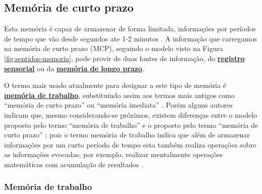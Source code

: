 \subsection{Memória de curto prazo } 
\label{sec:memoria:curto}



Esta memória é capaz de armazenar de forma limitada, 
informações por períodos de tempo que vão desde segundos ate 1-2 minutos
\cite[pp. 678]{spreen2006compendium} \cite[pp. 158]{sternbergpsicologia}.
A informação que carregamos na memória de curto prazo (MCP),
seguindo o modelo visto na Figura \ref{fig:sentidos-memoria},  
pode provir de duas fontes de informação, do \hyperref[fig:sentidos-memoria]{\textbf{registro sensorial}} 
ou da \hyperref[sec:memoria:longo]{\textbf{memória de longo prazo}}.


O termo mais usado atualmente para designar a este tipo de memória é 
\hyperref[subsubsec:memoriatrabalho]{\textbf{memória de trabalho}},
substituindo assim aos termos mais antigos como ``memória de curto prazo'' ou ``memória imediata''
\cite[pp. 678]{spreen2006compendium}.
Porém alguns autores indicam  que, mesmo considerando-se próximos, 
existem diferenças entre o modelo proposto pelo termo 
``memória de trabalho'' e o proposto pelo termo ``memória de curto prazo'' 
\cite[pp. 266, 267, 269]{braisby2012cognitive};
pois o termo memória de trabalho indica que além de armazenar informações por um curto período de tempo
esta também realiza operações sobre as informações evocadas; 
por exemplo, realizar mentalmente operações matemáticas com acumulação de resultados 
\cite[pp. 267, 272]{braisby2012cognitive}.


\subsubsection{Memória de trabalho} 
\label{subsubsec:memoriatrabalho}

